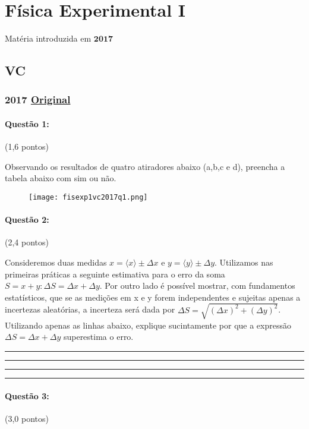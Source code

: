\documentclass[12pt,a4paper]{article}
\newcommand{\original}[1]{\tiny \href{#1}{Original} \normalsize}
\begin{document}
\section{Física Experimental I}
Matéria introduzida em $\textbf{2017}$

\subsection{VC }
\subsubsection{2017 \original{https://drive.google.com/file/d/1HzrrIy45dWkC2uAnbkOWLmMVkTN1mn3W/view?usp=sharing}}



\paragraph{Questão 1:}  (1,6 pontos)

Observando os resultados de quatro atiradores abaixo  (a,b,c e d), preencha a tabela abaixo com sim ou não.

\begin{figure}[h]
\centering
\texttt{[image: fisexp1vc2017q1.png]}
\end{figure}


\paragraph{Questão 2:} (2,4 pontos)

Consideremos duas medidas $ x = \langle x\rangle \pm \Delta x$  e  $ y = \langle y\rangle \pm \Delta y$. Utilizamos nas primeiras práticas a seguinte estimativa para o erro da soma $S = x + y : \Delta S = \Delta x + \Delta y$.
Por outro lado é  possível mostrar, com fundamentos estatísticos, que se as medições em x e y forem independentes e sujeitas apenas a incertezas aleatórias, a incerteza será dada por $\Delta S = \sqrt{(\Delta x)^2 +( \Delta y)^2} $. Utilizando apenas as linhas abaixo, explique sucintamente por que a expressão
$\Delta S = \Delta x + \Delta y$  superestima o erro.
\\

\rule{13cm}{0.4pt}

\rule{13cm}{0.4pt}

\rule{13cm}{0.4pt}

\rule{13cm}{0.4pt}

\paragraph{Questão 3:} (3,0 pontos)
\end{document}
